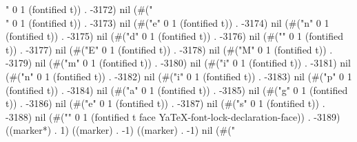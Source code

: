" 0 1 (fontified t)) . -3172) nil (#("\\" 0 1 (fontified t)) . -3173) nil (#("e" 0 1 (fontified t)) . -3174) nil (#("n" 0 1 (fontified t)) . -3175) nil (#("d" 0 1 (fontified t)) . -3176) nil (#("{" 0 1 (fontified t)) . -3177) nil (#("E" 0 1 (fontified t)) . -3178) nil (#("M" 0 1 (fontified t)) . -3179) nil (#("m" 0 1 (fontified t)) . -3180) nil (#("i" 0 1 (fontified t)) . -3181) nil (#("n" 0 1 (fontified t)) . -3182) nil (#("i" 0 1 (fontified t)) . -3183) nil (#("p" 0 1 (fontified t)) . -3184) nil (#("a" 0 1 (fontified t)) . -3185) nil (#("g" 0 1 (fontified t)) . -3186) nil (#("e" 0 1 (fontified t)) . -3187) nil (#("s" 0 1 (fontified t)) . -3188) nil (#("}" 0 1 (fontified t face YaTeX-font-lock-declaration-face)) . -3189) ((marker*) . 1) ((marker) . -1) ((marker) . -1) nil (#("%